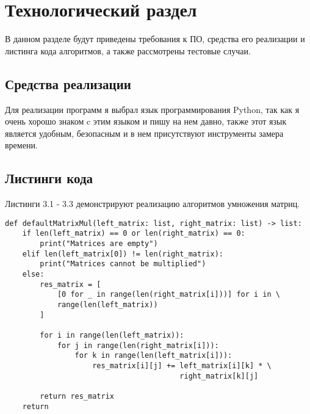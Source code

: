 \chapter{Технологический раздел}

В данном разделе будут приведены требования к ПО, средства его реализации и листинга кода алгоритмов, а также рассмотрены тестовые случаи.

\section{Средства реализации} 

Для реализации программ я выбрал язык программирования Python, так как я очень хорошо знаком c этим языком и пишу на нем давно, также этот язык является удобным, безопасным и в нем присутствуют инструменты замера времени.

\section{Листинги кода}

Листинги 3.1 - 3.3 демонстрируют реализацию алгоритмов умножения матриц.

\captionsetup{singlelinecheck = false, justification=raggedright}
\begin{lstlisting}[label=multStand, caption=Стандартный алгоритм умножения матриц]
def defaultMatrixMul(left_matrix: list, right_matrix: list) -> list:
    if len(left_matrix) == 0 or len(right_matrix) == 0:
        print("Matrices are empty")
    elif len(left_matrix[0]) != len(right_matrix):
        print("Matrices cannot be multiplied")
    else:
        res_matrix = [
            [0 for _ in range(len(right_matrix[i]))] for i in \
            range(len(left_matrix))
        ]

        for i in range(len(left_matrix)):
            for j in range(len(right_matrix[i])):
                for k in range(len(left_matrix[i])):
                    res_matrix[i][j] += left_matrix[i][k] * \
                                        right_matrix[k][j]

        return res_matrix
    return
\end{lstlisting}

